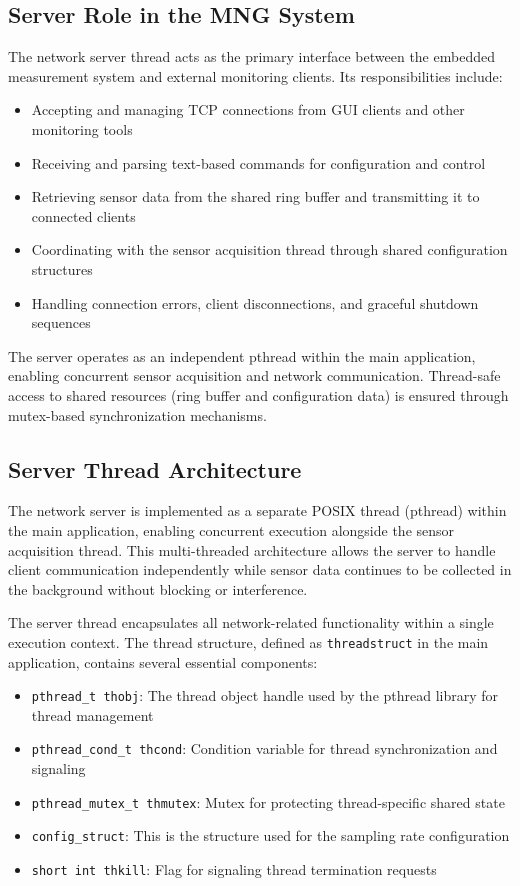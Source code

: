 \subsection{Server Role in the MNG System}

The network server thread acts as the primary interface between the embedded measurement system and external monitoring clients. Its responsibilities include:

\begin{itemize}
	\item Accepting and managing TCP connections from GUI clients and other monitoring tools
	\item Receiving and parsing text-based commands for configuration and control
	\item Retrieving sensor data from the shared ring buffer and transmitting it to connected clients
	\item Coordinating with the sensor acquisition thread through shared configuration structures
	\item Handling connection errors, client disconnections, and graceful shutdown sequences
\end{itemize}

The server operates as an independent pthread within the main application, enabling concurrent sensor acquisition and network communication. Thread-safe access to shared resources (ring buffer and configuration data) is ensured through mutex-based synchronization mechanisms.

\subsection{Server Thread Architecture}
The network server is implemented as a separate POSIX thread (pthread) within the main application, enabling concurrent execution alongside the sensor acquisition thread. This multi-threaded architecture allows the server to handle client communication independently while sensor data continues to be collected in the background without blocking or interference.

The server thread encapsulates all network-related functionality within a single execution context. The thread structure, defined as \texttt{threadstruct} in the main application, contains several essential components:

\begin{itemize}
	\item \texttt{pthread\_t thobj}: The thread object handle used by the pthread library for thread management
	\item \texttt{pthread\_cond\_t thcond}: Condition variable for thread synchronization and signaling
	\item \texttt{pthread\_mutex\_t thmutex}: Mutex for protecting thread-specific shared state
	\item \texttt{config\_struct}: This is the structure used for the sampling rate configuration
	\item \texttt{short int thkill}: Flag for signaling thread termination requests
\end{itemize}

